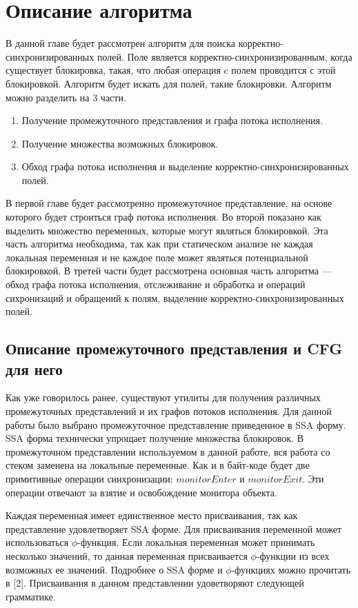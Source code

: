 \chapter{Описание алгоритма}


В данной главе будет рассмотрен алгоритм для поиска корректно-синхронизированных полей.
Поле является корректно-синхронизированным, когда существует блокировка, такая, что любая операция c полем проводится с этой блокировкой. Алгоритм будет искать для полей, такие блокировки. 
Алгоритм можно разделить на 3 части. 
\begin{enumerate}
\item Получение промежуточного представления и графа потока исполнения.
\item Получение множества возможных блокировок.
\item Обход графа потока исполнения и выделение корректно-синхронизированных полей.
\end{enumerate}

В первой главе будет рассмотренно промежуточное представление, на основе которого будет строиться граф потока исполнения. Во второй показано как выделить множество переменных, которые могут являться блокировкой. Эта часть алгоритма необходима, так как при статическом анализе не каждая локальная переменная и не каждое поле может являться потенциальной блокировкой. 
В третей части будет рассмотрена основная часть алгоритма --- обход графа потока исполнения, отслеживание и обработка и операций сихронизаций и обращений к полям, выделение корректно-синхронизированных полей.



\FloatBarrier
\section{Описание промежуточного представления и CFG для него}
Как уже говорилось ранее, существуют утилиты для получения различных промежуточных представлений и их графов потоков исполнения. 
Для данной работы было выбрано промежуточное представление приведенное в SSA форму. SSA форма технически упрощает получение множества блокировок. В промежуточном представлении используемом в данной работе, вся работа со стеком заменена на локальные переменные. Как и в байт-коде будет две примитивные операции синхронизации: $monitorEnter$ и $monitorExit$. Эти операции отвечают за взятие и освобождение монитора объекта.

Каждая переменная имеет единственное место присваивания, так как представление удовлетворяет SSA форме. 
Для присваивания переменной может использоваться $\phi$-функция.
Если локальная переменная может принимать несколько значений, то данная переменная присваивается $\phi$-функции из всех возможных ее значений. Подробнее о SSA форме и $\phi$-функциях можно прочитать в [2].
Присваивания в данном представлении удоветворяют следующей грамматике.

